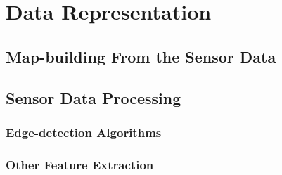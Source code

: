 

\chapter{Data Representation}


\section{Map-building From the Sensor Data}


\section{Sensor Data Processing}


\subsection{Edge-detection Algorithms}


\subsection{Other Feature Extraction}




